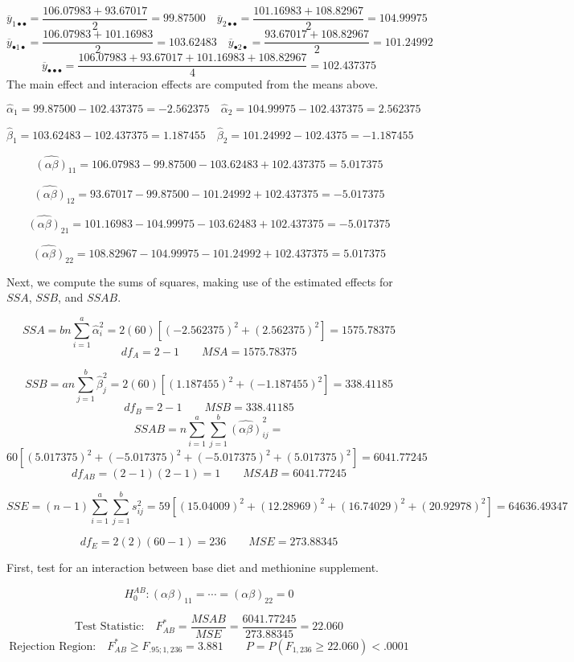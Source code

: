 \documentclass[
]{book}
\begin{document}
\[
\overline{y}_{1\bullet\bullet}=\frac{106.07983+93.67017}{2}=99.87500 \quad
\overline{y}_{2\bullet\bullet}=\frac{101.16983+108.82967}{2}=104.99975 
\] \[
\overline{y}_{\bullet 1 \bullet}=\frac{106.07983+101.16983}{2}=103.62483 \quad
\overline{y}_{\bullet 2 \bullet}=\frac{93.67017+108.82967}{2}=101.24992 
\] \[
\overline{y}_{\bullet\bullet\bullet}=\frac{106.07983+93.67017+101.16983+108.82967}{4}=
102.437375
\] The main effect and interacion effects are computed from the means
above.

\[
\hat{\alpha}_1=99.87500-102.437375=-2.562375 \quad
\hat{\alpha}_2=104.99975-102.437375=2.562375 
\]

\[
\hat{\beta}_1=103.62483-102.437375=1.187455 \quad
\hat{\beta}_2=101.24992-102.4375=-1.187455
\]

\[
\hat{(\alpha\beta)}_{11}=106.07983-99.87500-103.62483+102.437375=5.017375
\]

\[
\hat{(\alpha\beta)}_{12}=93.67017-99.87500-101.24992+102.437375=-5.017375
\]

\[
\hat{(\alpha\beta)}_{21}=101.16983-104.99975-103.62483+102.437375=-5.017375
\]

\[
\hat{(\alpha\beta)}_{22}=108.82967-104.99975-101.24992+102.437375=5.017375
\]

Next, we compute the sums of squares, making use of the estimated
effects for \(SSA\), \(SSB\), and \(SSAB\).

\[
SSA=bn\sum_{i=1}^a\hat{\alpha}_i^2 = 
2(60)\left[(-2.562375)^2+(2.562375)^2\right]=1575.78375
\] \[
df_A=2-1 \qquad
MSA=1575.78375
\]

\[
SSB=an\sum_{j=1}^b\hat{\beta}_j^2 = 
2(60)\left[(1.187455)^2+(-1.187455)^2\right]=338.41185
\] \[
df_B=2-1 \qquad
MSB=338.41185
\] \[
SSAB=n\sum_{i=1}^a\sum_{j=1}^b\hat{(\alpha\beta)}_{ij}^2 =
\] \[
60\left[(5.017375)^2+(-5.017375)^2+(-5.017375)^2+(5.017375)^2\right]
=6041.77245
\] \[
df_{AB}=(2-1)(2-1)=1 \qquad MSAB=6041.77245
\]

\[
SSE=(n-1)\sum_{i=1}^a\sum_{j=1}^bs_{ij}^2=
59\left[(15.04009)^2+(12.28969)^2+(16.74029)^2+(20.92978)^2\right]=64636.49347
\]

\[
df_E=2(2)(60-1)=236 \qquad MSE=273.88345
\]

First, test for an interaction between base diet and methionine
supplement.

\[
H_0^{AB}: (\alpha\beta)_{11} = \cdots = (\alpha\beta)_{22} = 0 
\]

\[
\mbox{Test Statistic:} \quad F_{AB}^*=\frac{MSAB}{MSE}=\frac{6041.77245}{273.88345} = 22.060
\] \[
\mbox{Rejection Region:} \quad F_{AB}^* \ge F_{.95;1,236}=3.881
\qquad P=P\left(F_{1,236}\ge 22.060\right) < .0001
\]
\end{document}
